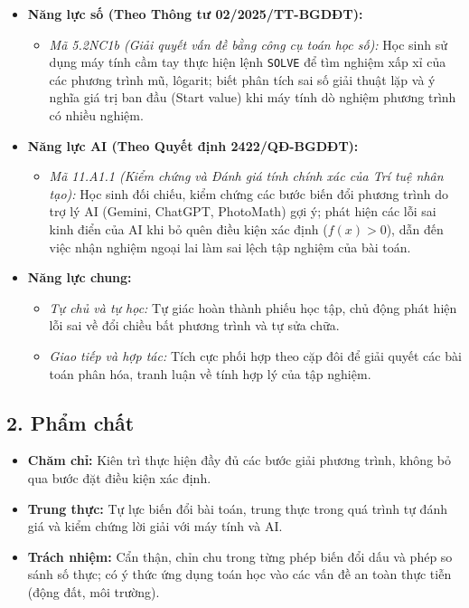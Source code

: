 \documentclass[12pt, a4paper]{article}
\begin{document}
\begin{itemize}[leftmargin=1.2cm]
    \item \textbf{Năng lực số (Theo Thông tư 02/2025/TT-BGDĐT):}
    \begin{itemize}[leftmargin=0.6cm]
        \item \textit{Mã 5.2NC1b (Giải quyết vấn đề bằng công cụ toán học số):} Học sinh sử dụng máy tính cầm tay thực hiện lệnh \texttt{SOLVE} để tìm nghiệm xấp xỉ của các phương trình mũ, lôgarit; biết phân tích sai số giải thuật lặp và ý nghĩa giá trị ban đầu (Start value) khi máy tính dò nghiệm phương trình có nhiều nghiệm.
    \end{itemize}

    \item \textbf{Năng lực AI (Theo Quyết định 2422/QĐ-BGDĐT):}
    \begin{itemize}[leftmargin=0.6cm]
        \item \textit{Mã 11.A1.1 (Kiểm chứng và Đánh giá tính chính xác của Trí tuệ nhân tạo):} Học sinh đối chiếu, kiểm chứng các bước biến đổi phương trình do trợ lý AI (Gemini, ChatGPT, PhotoMath) gợi ý; phát hiện các lỗi sai kinh điển của AI khi bỏ quên điều kiện xác định ($f(x) > 0$), dẫn đến việc nhận nghiệm ngoại lai làm sai lệch tập nghiệm của bài toán.
    \end{itemize}

    \item \textbf{Năng lực chung:}
    \begin{itemize}[leftmargin=0.6cm]
        \item \textit{Tự chủ và tự học:} Tự giác hoàn thành phiếu học tập, chủ động phát hiện lỗi sai về đổi chiều bất phương trình và tự sửa chữa.
        \item \textit{Giao tiếp và hợp tác:} Tích cực phối hợp theo cặp đôi để giải quyết các bài toán phân hóa, tranh luận về tính hợp lý của tập nghiệm.
    \end{itemize}
\end{itemize}

\subsection*{2. Phẩm chất}

\begin{itemize}[leftmargin=1.2cm]
    \item \textbf{Chăm chỉ:} Kiên trì thực hiện đầy đủ các bước giải phương trình, không bỏ qua bước đặt điều kiện xác định.
    \item \textbf{Trung thực:} Tự lực biến đổi bài toán, trung thực trong quá trình tự đánh giá và kiểm chứng lời giải với máy tính và AI.
    \item \textbf{Trách nhiệm:} Cẩn thận, chỉn chu trong từng phép biến đổi dấu và phép so sánh số thực; có ý thức ứng dụng toán học vào các vấn đề an toàn thực tiễn (động đất, môi trường).
\end{itemize}
\end{document}
